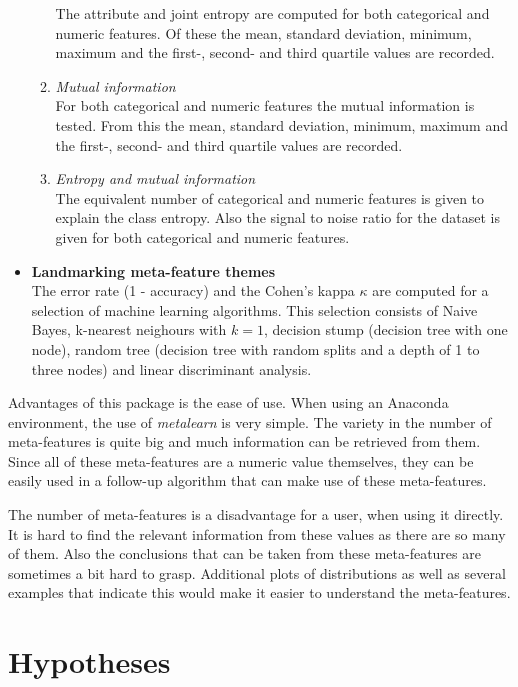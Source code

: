 \documentclass[10pt,a4paper]{article}
\begin{document}
\begin{itemize}
\begin{enumerate}
			The attribute and joint entropy are computed for both categorical and numeric features. Of these the mean, standard deviation, minimum, maximum and the first-, second- and third quartile values are recorded.
			\item \textit{Mutual information} \\
			For both categorical and numeric features the mutual information is tested. From this the mean, standard deviation, minimum, maximum and the first-, second- and third quartile values are recorded.
			\item \textit{Entropy and mutual information} \\
			The equivalent number of categorical and numeric features is given to explain the class entropy. Also the signal to noise ratio for the dataset is given for both categorical and numeric features.
		\end{enumerate}
		\item \textbf{Landmarking meta-feature themes} \\
		The error rate (1 - accuracy) and the Cohen's kappa $\kappa$ are computed for a selection of machine learning algorithms. This selection consists of Naive Bayes, k-nearest neighours with $k=1$, decision stump (decision tree with one node), random tree (decision tree with random splits and a depth of 1 to three nodes) and linear discriminant analysis.
	\end{itemize}
		
	Advantages of this package is the ease of use. When using an Anaconda environment, the use of \textit{metalearn} is very simple. The variety in the number of meta-features is quite big and much information can be retrieved from them. Since all of these meta-features are a numeric value themselves, they can be easily used in a follow-up algorithm that can make use of these meta-features. 
	
	The number of meta-features is a disadvantage for a user, when using it directly. It is hard to find the relevant information from these values as there are so many of them. Also the conclusions that can be taken from these meta-features are sometimes a bit hard to grasp. Additional plots of distributions as well as several examples that indicate this would make it easier to understand the meta-features.
	
	\section{Hypotheses}
	\label{sec:Hypothesis}
	
\end{document}
